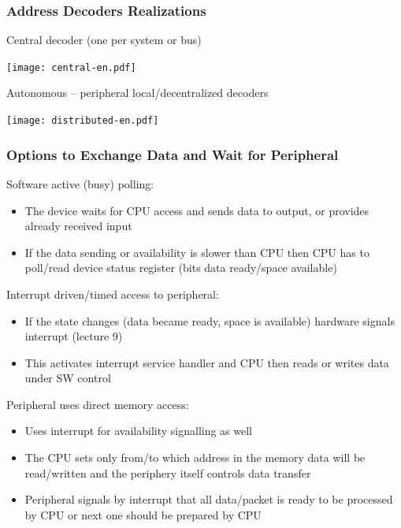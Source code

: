 \documentclass{beamer}
\begin{document}
\begin{frame}
\frametitle{Address Decoders Realizations}

Central decoder (one per system or bus)

\begin{center}
\texttt{[image: central-en.pdf]}
\end{center}

Autonomous -- peripheral local/decentralized decoders

\begin{center}
\texttt{[image: distributed-en.pdf]}
\end{center}
\end{frame}



\begin{frame}
\frametitle{Options to Exchange Data and Wait for Peripheral}
Software active (busy) polling:
\begin{itemize}
\item The device waits for CPU access and sends data to output, or provides already received input
\item If the data sending or availability is slower than CPU then CPU has to poll/read device status register (bits data ready/space available)
\end{itemize}

Interrupt driven/timed access to peripheral:
\begin{itemize}
\item If the state changes (data became ready, space is available) hardware signals interrupt (lecture 9)
\item This activates interrupt service handler and CPU then reads or writes data under SW control
\end{itemize}

Peripheral uses direct memory access:
\begin{itemize}
\item Uses interrupt for availability signalling as well
\item The CPU sets only from/to which address in the memory data will be read/written and the periphery itself controls data transfer
\item Peripheral signals by interrupt that all data/packet is ready to be processed by CPU or next one should be prepared by CPU
\end{itemize}

\end{frame}
\end{document}
